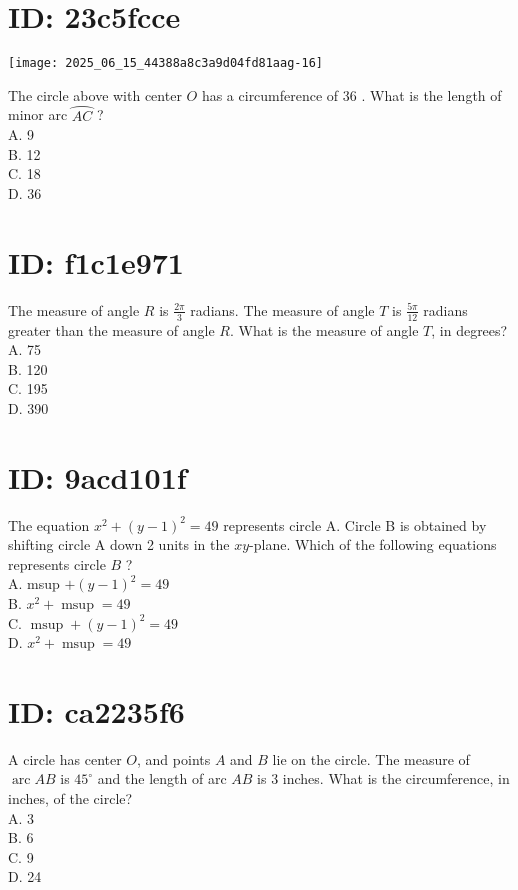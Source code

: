 \section*{ID: 23c5fcce}
\begin{center}
\texttt{[image: 2025\_06\_15\_44388a8c3a9d04fd81aag-16]}
\end{center}

The circle above with center $O$ has a circumference of 36 . What is the length of minor arc $\wideparen{A C}$ ?\\
A. 9\\
B. 12\\
C. 18\\
D. 36

\section*{ID: f1c1e971}
The measure of angle $R$ is $\frac{2 \pi}{3}$ radians. The measure of angle $T$ is $\frac{5 \pi}{12}$ radians greater than the measure of angle $R$. What is the measure of angle $T$, in degrees?\\
A. 75\\
B. 120\\
C. 195\\
D. 390

\section*{ID: 9acd101f}
The equation $x^{2}+(y-1)^{2}=49$ represents circle A. Circle B is obtained by shifting circle A down 2 units in the $x y$-plane. Which of the following equations represents circle $B$ ?\\
A. msup $+(y-1)^{2}=49$\\
B. $x^{2}+\operatorname{msup}=49$\\
C. $\operatorname{msup}+(y-1)^{2}=49$\\
D. $x^{2}+\operatorname{msup}=49$

\section*{ID: ca2235f6}
A circle has center $O$, and points $A$ and $B$ lie on the circle. The measure of $\operatorname{arc} A B$ is $45^{\circ}$ and the length of arc $A B$ is 3 inches. What is the circumference, in inches, of the circle?\\
A. 3\\
B. 6\\
C. 9\\
D. 24

